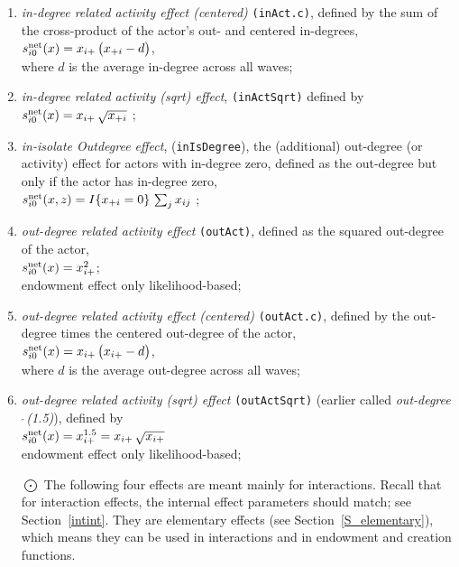 \documentclass[a4paper,fleqn,11pt]{article}
\newcommand{\+}{\, + \,}
\newcommand{\vit}{\theenumi}
\begin{document}
\begin{enumerate}
 \item {\em in-degree related activity effect (centered)} \texttt{(inAct.c)},
 defined by the sum of
 the cross-product of the actor's out- and centered in-degrees,\\
 $s^{\rm net}_{i\vit}(x) =  x_{i+}\,\big( x_{+i} - d \big)$,\\
 where $d$ is the average in-degree across all waves;

 \item {\em in-degree related activity (sqrt) effect}, \texttt{(inActSqrt)}
 defined by  \\
 $s^{\rm net}_{i\vit}(x) = x_{i+}\,\sqrt{x_{+i}}$ ;

\item \emph{in-isolate Outdegree effect}, (\texttt{inIsDegree}), the
      (additional) out-degree (or activity)
      effect for actors with in-degree zero, defined as the out-degree
      but only if the actor has in-degree zero,\\
 $s^{\rm net}_{i\vit}(x, z) =   I\{x_{+i} = 0 \}\, \sum_j x_{ij}   $ ;\\

 \item {\em out-degree related activity effect} \texttt{(outAct)},
 	 defined as the squared out-degree of the actor,\\
 $s^{\rm net}_{i\vit}(x) = x^2_{i+}$;\\
 endowment effect only likelihood-based;


 \item {\em out-degree related activity effect (centered)} \texttt{(outAct.c)},
 defined by the out-degree times the centered out-degree of the actor,\\
 $s^{\rm net}_{i\vit}(x) =  x_{i+}\,\big( x_{i+} - d \big)$,\\
 where $d$ is the average out-degree across all waves;

 \item {\em out-degree related activity (sqrt) effect}  \texttt{(outActSqrt)}
 (earlier called {\em out-degree$\,\hat{\ }$(1.5)}), defined by  \\
 $s^{\rm net}_{i\vit}(x) = x^{1.5}_{i+} = x_{i+}\,\sqrt{x_{i+}}$ \\
 endowment effect only likelihood-based;


 \item[{\hspace*{-1ex}$\bigodot$}]
The following four effects are meant mainly for interactions.
Recall that for interaction effects, the internal effect parameters
should match; see Section~\ref{intint}.
They are elementary effects (see Section~\ref {S_elementary}),
which means they can be used in interactions
 and in endowment and creation functions.



\end{enumerate}
\end{document}
